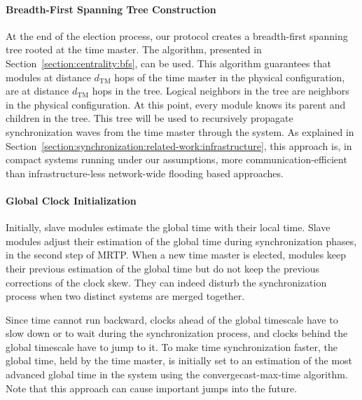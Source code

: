 \paragraph{Breadth-First Spanning Tree Construction}

At the end of the election process, our protocol creates a breadth-first spanning tree rooted at the time master. The \cheungCb{} algorithm, presented in Section~\ref{section:centrality:bfs}, can be used. This algorithm guarantees that modules at distance $d_{\mathrm{TM}}$ hops of the time master in the physical configuration, are at distance $d_{\mathrm{TM}}$ hops in the tree. Logical neighbors in the tree are neighbors in the physical configuration. At this point, every module knows its parent and children in the tree. This tree will be used to recursively propagate synchronization waves from the time master through the system. As explained in Section~\ref{section:synchronization:related-work:infrastructure}, this approach is, in compact systems running under our assumptions, more communication-efficient than infrastructure-less network-wide flooding based approaches.

\paragraph{Global Clock Initialization}

Initially, slave modules estimate the global time with their local time. Slave modules adjust their estimation of the global time during synchronization phases, in the second step of MRTP. When a new time master is elected, modules keep their previous estimation of the global time but do not keep the previous corrections of the clock skew. They can indeed disturb the synchronization process when two distinct systems are merged together.

Since time cannot run backward, clocks ahead of the global timescale have to slow down or to wait during the synchronization process, and clocks behind the global timescale have to jump to it. To make time synchronization faster, the global time, held by the time master, is initially set to an estimation of the most advanced global time in the system using the convergecast-max-time algorithm. Note that this approach can cause important jumps into the future.

